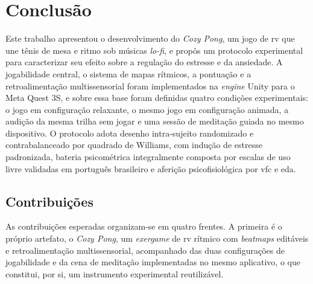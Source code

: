 \chapter{Conclusão}\label{cap:conclusao}
\glsresetall


Este trabalho apresentou o desenvolvimento do \textit{Cozy Pong}, um jogo de \gls{rv} que une tênis de mesa e ritmo sob músicas \textit{lo-fi}, e propôs um protocolo experimental para caracterizar seu efeito sobre a regulação do estresse e da ansiedade. A jogabilidade central, o sistema de mapas rítmicos, a pontuação e a retroalimentação multissensorial foram implementados na \textit{engine} Unity para o Meta Quest 3S, e sobre essa base foram definidas quatro condições experimentais: o jogo em configuração relaxante, o mesmo jogo em configuração animada, a audição da mesma trilha sem jogar e uma sessão de meditação guiada no mesmo dispositivo. O protocolo adota desenho intra-sujeito randomizado e contrabalanceado por quadrado de Williams, com indução de estresse padronizada, bateria psicométrica integralmente composta por escalas de uso livre validadas em português brasileiro e aferição psicofisiológica por \gls{vfc} e \gls{eda}.


\section{Contribuições}\label{sec:conc-contribuicoes}

As contribuições esperadas organizam-se em quatro frentes. A primeira é o próprio artefato, o \textit{Cozy Pong}, um \textit{exergame} de \gls{rv} rítmico com \textit{beatmaps} editáveis e retroalimentação multissensorial, acompanhado das duas configurações de jogabilidade e da cena de meditação implementadas no mesmo aplicativo, o que constitui, por si, um instrumento experimental reutilizável.

